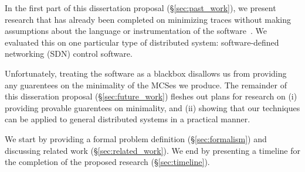 In the first part of this dissertation proposal (\S\ref{sec:past_work}), we present research that has
already been completed on minimizing traces without making assumptions about the language
or instrumentation of the software~\cite{sts2014}. We evaluated this on one
particular type of distributed system: software-defined networking
(SDN) control software.


Unfortunately, treating the software as a blackbox disallows us from
providing any guarentees on the minimality of the MCSes we produce.
The remainder of this disseration proposal (\S\ref{sec:future_work}) fleshes out plans for research on
(i) providing provable guarentees on minimality, and (ii) showing
that our techniques can be applied to general distributed systems in a
practical manner.

We start by providing a formal problem definition (\S\ref{sec:formalism}) and
discussing related work (\S\ref{sec:related_work}). We end by
presenting a timeline for the completion of the proposed research (\S\ref{sec:timeline}).
